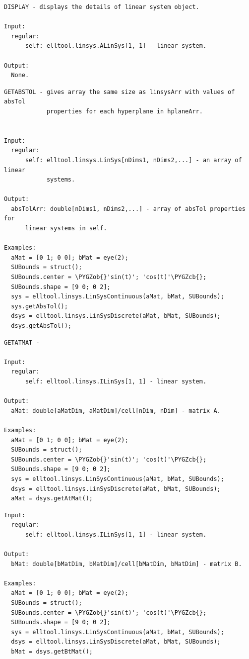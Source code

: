 \documentclass[letterpaper,10pt,english]{sphinxmanual}
\def\PYGZob{\char`\{}
\def\PYGZcb{\char`\}}
\begin{document}
\label{chap_func:elltool-linsys-alinsys-display}
\begin{Verbatim}[commandchars=\\\{\}]
DISPLAY - displays the details of linear system object.

Input:
  regular:
      self: elltool.linsys.ALinSys[1, 1] - linear system.

Output:
  None.
\end{Verbatim}
\label{chap_func:elltool-linsys-alinsys-getabstol}
\begin{Verbatim}[commandchars=\\\{\}]
GETABSTOL - gives array the same size as linsysArr with values of absTol
            properties for each hyperplane in hplaneArr.


Input:
  regular:
      self: elltool.linsys.LinSys[nDims1, nDims2,...] - an array of linear
            systems.

Output:
  absTolArr: double[nDims1, nDims2,...] - array of absTol properties for
      linear systems in self.

Examples:
  aMat = [0 1; 0 0]; bMat = eye(2);
  SUBounds = struct();
  SUBounds.center = \PYGZob{}'sin(t)'; 'cos(t)'\PYGZcb{};
  SUBounds.shape = [9 0; 0 2];
  sys = elltool.linsys.LinSysContinuous(aMat, bMat, SUBounds);
  sys.getAbsTol();
  dsys = elltool.linsys.LinSysDiscrete(aMat, bMat, SUBounds);
  dsys.getAbsTol();
\end{Verbatim}
\label{chap_func:elltool-linsys-alinsys-getatmat}
\begin{Verbatim}[commandchars=\\\{\}]
GETATMAT -

Input:
  regular:
      self: elltool.linsys.ILinSys[1, 1] - linear system.

Output:
  aMat: double[aMatDim, aMatDim]/cell[nDim, nDim] - matrix A.

Examples:
  aMat = [0 1; 0 0]; bMat = eye(2);
  SUBounds = struct();
  SUBounds.center = \PYGZob{}'sin(t)'; 'cos(t)'\PYGZcb{};
  SUBounds.shape = [9 0; 0 2];
  sys = elltool.linsys.LinSysContinuous(aMat, bMat, SUBounds);
  dsys = elltool.linsys.LinSysDiscrete(aMat, bMat, SUBounds);
  aMat = dsys.getAtMat();
\end{Verbatim}
\label{chap_func:elltool-linsys-alinsys-getbtmat}
\begin{Verbatim}[commandchars=\\\{\}]
Input:
  regular:
      self: elltool.linsys.ILinSys[1, 1] - linear system.

Output:
  bMat: double[bMatDim, bMatDim]/cell[bMatDim, bMatDim] - matrix B.

Examples:
  aMat = [0 1; 0 0]; bMat = eye(2);
  SUBounds = struct();
  SUBounds.center = \PYGZob{}'sin(t)'; 'cos(t)'\PYGZcb{};
  SUBounds.shape = [9 0; 0 2];
  sys = elltool.linsys.LinSysContinuous(aMat, bMat, SUBounds);
  dsys = elltool.linsys.LinSysDiscrete(aMat, bMat, SUBounds);
  bMat = dsys.getBtMat();
\end{Verbatim}
\end{document}
